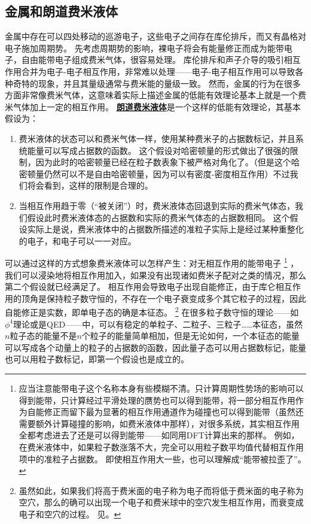\documentclass[hyperref, UTF8, a4paper]{ctexart}
\renewcommand{\autoref}{\prettyref}
\newcommand*{\concept}[1]{\underline{\textbf{#1}}}
\begin{document}
\subsection{金属和朗道费米液体}

金属中存在可以四处移动的巡游电子，这些电子之间存在库伦排斥，而又有晶格对电子施加周期势。
先考虑周期势的影响，裸电子将会有能量修正而成为能带电子，自由能带电子组成费米气体，很容易处理。
库伦排斥和声子介导的吸引相互作用合并为电子-电子相互作用，非常难以处理——电子-电子相互作用可以导致各种奇特的现象，并且其量级通常与费米能的量级一致。
然而，金属的行为在很多方面非常像费米气体，这意味着实际上描述金属的低能有效理论基本上就是一个费米气体加上一定的相互作用。
\concept{朗道费米液体}是一个这样的低能有效理论，其基本假设为：
\begin{enumerate}
    \item 费米液体的状态可以和费米气体一样，使用某种费米子的占据数标记，并且系统能量可以写成占据数的函数。
    这个假设对哈密顿量的形式做出了很强的限制，因为此时的哈密顿量已经在粒子数表象下被严格对角化了。（但是这个哈密顿量仍然可以不是自由哈密顿量，因为可以有密度-密度相互作用）不过我们将会看到，这样的限制是合理的。
    \item 当相互作用趋于零（“被关闭”）时，费米液体态回退到实际的费米气体态，我们假设此时费米液体态的占据数和实际的费米气体态的占据数相同。
    这个假设实际上是说，费米液体中的占据数所描述的准粒子实际上是经过某种重整化的电子，和电子可以一一对应。
\end{enumerate}

可以通过这样的方式想象费米液体可以怎样产生：对无相互作用的能带电子%
\footnote{
    应当注意能带电子这个名称本身有些模糊不清。只计算周期性势场的影响可以得到能带，只计算经过平滑处理的赝势也可以得到能带，将一部分相互作用作为自能修正而留下最为显著的相互作用通道作为碰撞也可以得到能带（虽然还需要额外计算碰撞的影响，如费米液体中那样），对很多系统，其实相互作用全都考虑进去了还是可以得到能带——如同用DFT计算出来的那样。
    例如，在费米液体中，如果粒子数涨落不大，完全可以用粒子数平均值代替相互作用项中的准粒子占据数。
    即使相互作用大一些，也可以理解成“能带被拉歪了”。
}%
，我们可以浸染地将相互作用加入，如果没有出现诸如费米子配对之类的情况，那么第二个假设就已经满足了。
相互作用会导致电子出现自能修正，由于库仑相互作用的顶角是保持粒子数守恒的，不存在一个电子衰变成多个其它粒子的过程，因此自能修正是实数，即单电子态的确是本征态。%
\footnote{
    虽然如此，如果我们将高于费米面的电子称为电子而将低于费米面的电子称为空穴，那么的确可以出现一个电子和费米球中的空穴发生相互作用，而衰变成电子和空穴的过程。
    见\autoref{sec:fermi-liquid-ground}。
}%
在很多粒子数守恒的理论——如$\phi^4$理论或是QED——中，可以有稳定的单粒子、二粒子、三粒子……本征态，虽然$n$粒子态的能量不是$n$个粒子的能量简单相加，但是无论如何，一个本征态的能量可以写成各个动量上的粒子的占据数的函数，因此量子态可以用占据数标记，能量也可以用粒子数标记，即第一个假设也是成立的。
\end{document}
